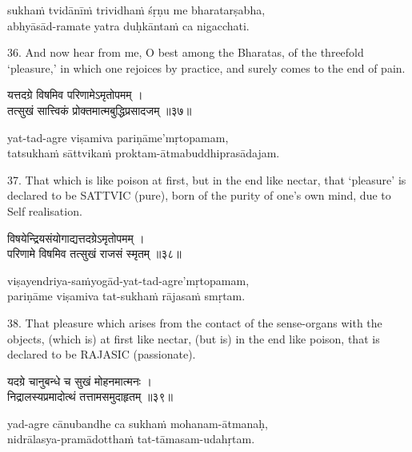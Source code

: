 \begin{transliteration}
sukhaṁ tvidānīṁ trividhaṁ śṛṇu me bharatarṣabha, \\
abhyāsād-ramate yatra duḥkāntaṁ ca nigacchati.
\end{transliteration}

36. And now hear from me, O best among the Bharatas, of the threefold
`pleasure,' in which one rejoices by practice, and surely comes to the end of
pain.

\begin{gitaverse}
यत्तदग्रे विषमिव परिणामेऽमृतोपमम् । \\
तत्सुखं सात्त्विकं प्रोक्तमात्मबुद्धिप्रसादजम् ॥३७॥
\end{gitaverse}

\begin{transliteration}
yat-tad-agre viṣamiva pariṇāme'mṛtopamam, \\
tatsukhaṁ sāttvikaṁ proktam-ātmabuddhiprasādajam.
\end{transliteration}

37. That which is like poison at first, but in the end like nectar, that
`pleasure' is declared to be SATTVIC (pure), born of the purity of one's own
mind, due to Self realisation.

\begin{gitaverse}
विषयेन्द्रियसंयोगाद्यत्तदग्रेऽमृतोपमम् । \\
परिणामे विषमिव तत्सुखं राजसं स्मृतम् ॥३८॥
\end{gitaverse}

\begin{transliteration}
viṣayendriya-saṁyogād-yat-tad-agre'mṛtopamam, \\
pariṇāme viṣamiva tat-sukhaṁ rājasaṁ smṛtam.
\end{transliteration}

38. That pleasure which arises from the contact of the sense-organs with the
objects, (which is) at first like nectar, (but is) in the end like poison, that
is declared to be RAJASIC (passionate).

\begin{gitaverse}
यदग्रे चानुबन्धे च सुखं मोहनमात्मनः । \\
निद्रालस्यप्रमादोत्थं तत्तामसमुदाहृतम् ॥३९॥
\end{gitaverse}

\begin{transliteration}
yad-agre cānubandhe ca sukhaṁ mohanam-ātmanaḥ, \\
nidrālasya-pramādotthaṁ tat-tāmasam-udahṛtam.
\end{transliteration}

